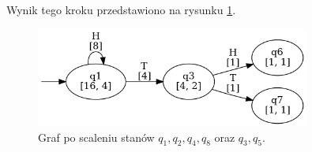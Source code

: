 Wynik tego kroku przedstawiono na rysunku \ref{fig:alergia_example_1}.  

\begin{figure}[ht]
    \centering
    \includegraphics[width=0.8\textwidth]{images/run_example/alergia/1.png}
    \caption{Graf po scaleniu stanów \( q_1, q_2, q_4, q_8 \) oraz \( q_3, q_5 \).}
    \label{fig:alergia_example_1}
\end{figure}  
